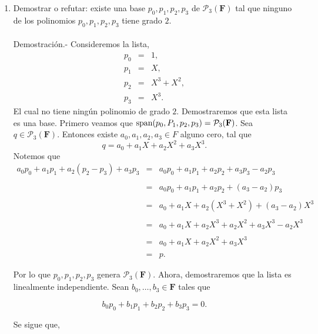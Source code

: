 \begin{enumerate}[\bfseries 1.]
\begin{enumerate}[(a)]
	\end{enumerate}

    \item Demostrar o refutar: existe una base $p_0,p_1,p_2,p_3$ de $\mathcal{P}_3(\textbf{F})$ tal que ninguno de los polinomios $p_0,p_1,p_2,p_3$ tiene grado $2$.\\\\
	Demostración.-\; Consideremos la lista,
	$$
	\begin{array}{rcl}
	    p_0&=&1,\\
	    p_1&=&X,\\
	    p_2&=&X^3+X^2,\\
	    p_3&=&X^3.
	\end{array}
	$$
	El cual no tiene ningún polinomio de grado $2$. Demostraremos que esta lista es una base. Primero veamos que $\span(p_0,P_1,p_2,p_3)=\mathcal{P}_3(\textbf{F})$. Sea $q\in \mathcal{P}_3(\textbf{F})$. Entonces existe $a_0,a_1,a_2,a_3\in F$ alguno cero, tal que
	$$q=a_0+a_1X+a_2X^2+a_3X^3.$$
	Notemos que
	$$
	\begin{array}{rcl}
	    a_0p_0+a_1p_1+a_2(p_2-p_3)+a_3p_3 &=& a_0p_0+a_1p_1+a_2p_2+a_3p_3-a_2p_3\\\\
					      &=& a_0p_0+a_1p_1+a_2p_2+(a_3-a_2)p_3\\\\
					      &=& a_0+a_1X+a_2\left(X^3+X^2\right)+(a_3-a_2)X^3\\\\
					      &=& a_0+a_1X+a_2X^3+a_2X^2+a_3X^3-a_2X^3\\\\
					      &=& a_0+a_1X+a_2X^2+a_3X^3\\\\
					      &=& p.

	\end{array}
	$$

	Por lo que $p_0,p_1,p_2,p_3$ genera $\mathcal{P}_3(\textbf{F})$. Ahora, demostraremos que la lista es linealmente independiente. Sean $b_0,\ldots,b_3\in \textbf{F}$ tales que

	$$b_0p_0+b_1p_1+b_2p_2+b_3p_3=0.$$

	Se sigue que,


\end{enumerate}
